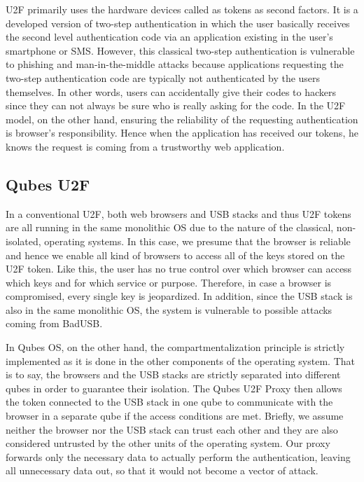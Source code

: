 \documentclass[runningheads,a4paper]{article}
\begin{document}
U2F primarily uses the hardware devices called as tokens as second
factors. It is a developed version of two-step authentication in which
the user basically receives the second level authentication code via
an application existing in the user's smartphone or SMS. However, this
classical two-step authentication is vulnerable to phishing and
man-in-the-middle attacks because applications requesting the two-step
authentication code are typically not authenticated by the
users themselves. In other words, users can accidentally give their codes to
hackers since they can not always be sure who is really asking for the
code. In the U2F model, on the other hand, ensuring the reliability of
the requesting authentication is browser's responsibility. Hence
when the application has received our tokens, he knows the request is
coming from a trustworthy web application.

\subsection{Qubes U2F} 

In a conventional U2F, both web browsers and
USB stacks and thus U2F tokens are all running in the same monolithic
OS due to the nature of the classical, non-isolated, operating
systems. In this case, we presume that the browser is reliable and
hence we enable all kind of browsers to access all of the keys stored
on the U2F token. Like this, the user has no true control over which
browser can access which keys and for which service or
purpose. Therefore, in case a browser is compromised, every single key
is jeopardized. In addition, since the USB stack is also
in the same monolithic OS, the system is vulnerable to possible
attacks coming from BadUSB.

In Qubes OS, on the other hand, the
compartmentalization principle is strictly implemented as it is done in the other components of the operating system. That is to
say, the browsers and the USB stacks are strictly separated into
different qubes in order to guarantee their isolation.  The Qubes U2F
Proxy then allows the token connected to the USB stack in one qube to
communicate with the browser in a separate qube if the access
conditions are met. Briefly, we assume neither the browser nor the USB
stack can trust each other and they are also considered untrusted by the other units of the operating system. Our
proxy forwards only the necessary data to actually perform the
authentication, leaving all unnecessary data out, so that it would not
become a vector of attack.
\end{document}
